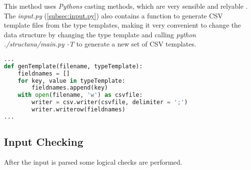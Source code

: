This method uses \textit{Pythons} casting methods, which are very sensible and relyable \cite[2.4.1-2.4.6]{pythonTypes}. 
The \textit{input.py} (\cref{subsec:input.py}) also contains a function to generate CSV template files from the type templates, making it very convenient to change the data structure by changing the type template and calling \textit{python ./structana/main.py -T} to generate a new set of CSV templates.

\begin{inconsolata}
\begin{minipage}{\linewidth}
\begin{lstlisting}[language=python]
...
def genTemplate(filename, typeTemplate):
    fieldnames = []
    for key, value in typeTemplate:
        fieldnames.append(key)
    with open(filename, 'w') as csvfile:
        writer = csv.writer(csvfile, delimiter = ';')
        writer.writerow(fieldnames)
...
\end{lstlisting}
\end{minipage}
\end{inconsolata}

\subsection{Input Checking}
\label{sec:inputcheck}

After the input is parsed some logical checks are performed.

